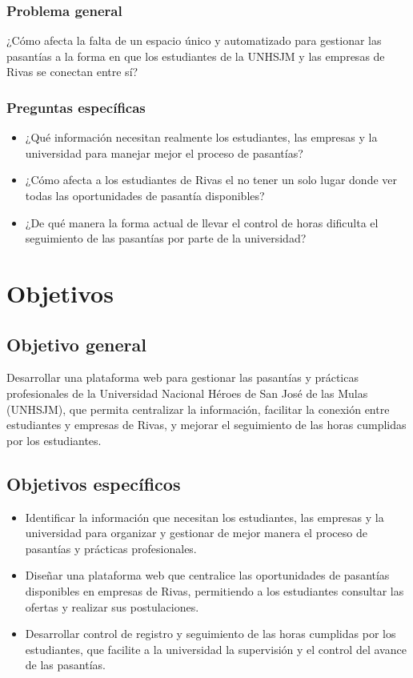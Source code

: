 \subsubsection{Problema general}

¿Cómo afecta la falta de un espacio único y automatizado para gestionar las pasantías a la forma en que los estudiantes de la UNHSJM y las empresas de Rivas se conectan entre sí?

\subsubsection{Preguntas específicas}

\begin{itemize}
	\item ¿Qué información necesitan realmente los estudiantes, las empresas y la universidad para manejar mejor el proceso de pasantías?
	\item ¿Cómo afecta a los estudiantes de Rivas el no tener un solo lugar donde ver todas las oportunidades de pasantía disponibles?
	\item ¿De qué manera la forma actual de llevar el control de horas dificulta el seguimiento de las pasantías por parte de la universidad?
\end{itemize}

\newpage

\section{Objetivos}

\subsection{Objetivo general}
Desarrollar una plataforma web para gestionar las pasantías y prácticas profesionales de la Universidad Nacional Héroes de San José de las Mulas (UNHSJM), que permita centralizar la información, facilitar la conexión entre estudiantes y empresas de Rivas, y mejorar el seguimiento de las horas cumplidas por los estudiantes.

\subsection{Objetivos específicos}
\begin{itemize}
	\item Identificar la información que necesitan los estudiantes, las empresas y la universidad para organizar y gestionar de mejor manera el proceso de pasantías y prácticas profesionales.
	\item Diseñar una plataforma web que centralice las oportunidades de pasantías disponibles en empresas de Rivas, permitiendo a los estudiantes consultar las ofertas y realizar sus postulaciones.
	\item Desarrollar control de registro y seguimiento de las horas cumplidas por los estudiantes, que facilite a la universidad la supervisión y el control del avance de las pasantías.
\end{itemize}

